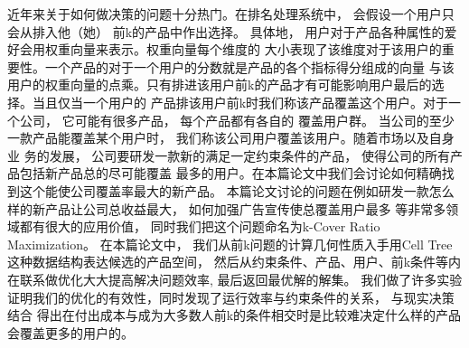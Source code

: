 \begin{cnabstract}
近年来关于如何做决策的问题十分热门。在排名处理系统中， 会假设一个用户只会从排入他（她）
前k的产品中作出选择。 具体地， 用户对于产品各种属性的爱好会用权重向量来表示。权重向量每个维度的
大小表现了该维度对于该用户的重要性。一个产品的对于一个用户的分数就是产品的各个指标得分组成的向量
与该用户的权重向量的点乘。只有排进该用户前k的产品才有可能影响用户最后的选择。当且仅当一个用户的
产品排该用户前k时我们称该产品覆盖这个用户。对于一个公司， 它可能有很多产品， 每个产品都有各自的
覆盖用户群。 当公司的至少一款产品能覆盖某个用户时， 我们称该公司用户覆盖该用户。随着市场以及自身业
务的发展， 公司要研发一款新的满足一定约束条件的产品， 使得公司的所有产品包括新产品总的尽可能覆盖
最多的用户。在本篇论文中我们会讨论如何精确找到这个能使公司覆盖率最大的新产品。 
本篇论文讨论的问题在例如研发一款怎么样的新产品让公司总收益最大， 如何加强广告宣传使总覆盖用户最多
等非常多领域都有很大的应用价值， 同时我们把这个问题命名为k-Cover Ratio Maximization。
在本篇论文中， 我们从前k问题的计算几何性质入手用Cell Tree这种数据结构表达候选的产品空间， 
然后从约束条件、产品、用户、前k条件等内在联系做优化大大提高解决问题效率, 最后返回最优解的解集。
我们做了许多实验证明我们的优化的有效性，同时发现了运行效率与约束条件的关系， 与现实决策结合
得出在付出成本与成为大多数人前k的条件相交时是比较难决定什么样的产品会覆盖更多的用户的。

\end{cnabstract}



